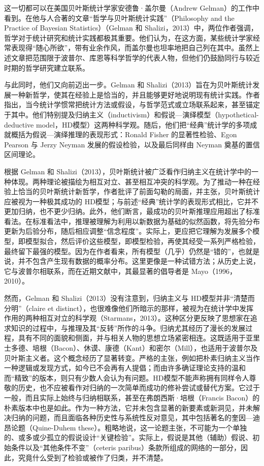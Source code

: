 这一切都可以在美国贝叶斯统计学家安德鲁·盖尔曼（Andrew Gelman）的工作中看到。在他与人合著的文章“哲学与贝叶斯统计实践”（Philosophy and the Practice of Bayesian Statistics）（Gelman 和 Shalizi，2013）中，两位作者强调，哲学对于统计研究和统计实践都极其重要。他们认为，在这方面，某些统计学家经常表现得“随心所欲”，带有业余作风，而盖尔曼也坦率地把自己列在其中。虽然上述文章把范围限于波普尔、库恩等科学哲学的代表人物，但他们仍鼓励同行与较近时期的哲学研究建立联系。

与此同时，他们又向前迈出一步。Gelman 和 Shalizi（2013）旨在为贝叶斯统计发展一种新哲学，使其在经验上是恰当的，并且能够更好地说明现有统计实践。作者指出，当今统计学惯常把统计方法或假设，与哲学范式或立场联系起来，甚至锚定于其中。他们特别提及归纳主义（inductivism）和假说—演绎模型（hypothetical-deductive model，HD模型）这两种科学观。随后，他们把“经典”统计学的多项成就概括为假说—演绎推理的表现形式：Ronald Fisher 的显著性检验、Egon Pearson 与 Jerzy Neyman 发展的假设检验，以及最后同样由 Neyman 奠基的置信区间理论。

根据 Gelman 和 Shalizi（2013），贝叶斯统计被广泛看作归纳主义在统计学中的一种体现。两种理论被描绘为相互对立、甚至相互冲突的科学观。为了推动一种在经验上恰当的贝叶斯统计新哲学，作者批评了前面勾勒的局面，并主张，贝叶斯统计应被视为一种极其成功的 HD模型；与前述“经典”统计学的表现形式相比，它并不更加归纳，也不更少归纳。此外，他们断言，最成功的贝叶斯推理应用超出了标准看法。在标准看法中，推理被理解为利用以新数据为基础的似然函数，将先验分布更新为后验分布，随后相应调整“信念程度”。实际上，更应把它理解为发展多个模型，即模型拟合，然后评价这些模型，即模型检验，再使其经受一系列严格检验，最终留下最强的模型。因为在作者看来，所有模型（几乎）仍然是“错的”，也就是说，并不包含产生现有数据的概率分布。这里更像是一种试错方法；从历史上说，它与波普尔相联系，而在近期文献中，其最显著的倡导者是 Mayo（1996，2010）。

然而，Gelman 和 Shalizi（2013）没有注意到，归纳主义与 HD模型并非“清楚而分明”（claire et distinct），也很难像他们所暗示的那样，被视为在统计学中发挥作用的两种相互对立的科学观（Starmans，2013）。这种区分更反映了思想家在追求知识的过程中，与推理及其“反转”所作的斗争。归纳尤其经历了漫长的发展过程，具有不同的面貌和侧面，并与相关人物的思想立场紧密相连。这既适用于亚里士多德、培根（Bacon）、休谟、康德（Kant）和密尔（Mill），也适用于波普尔及贝叶斯主义者。这个概念经历了显著转变。严格的主张，例如把朴素归纳主义当作一种逻辑或发现方式，如今已不会再有人提倡；而由许多确证理论支持的温和而“精致”的版本，则只有少数人会认为有问题。HD模型不能声称拥有同样令人尊敬的历史，也不应被看作对归纳的一次简单而成功的修补尝试或替代方案。它过于一般，而且实际上始终与归纳相联系，甚至在弗朗西斯·培根（Francis Bacon）的朴素版本中也是如此。作为一种方法，它并未包含显著的新要素或新洞见，并未解决归纳的问题，而且面临各种历史性与系统性反对意见，其中包括著名的奎因—迪昂论题（Quine-Duhem these）。粗略地说，这一论题主张，不可能为一个单独的、或多或少孤立的假说设计“关键检验”。实际上，假说是其他（辅助）假说、初始条件以及“其他条件不变”（ceteris paribus）条款所组成的网络的一部分，因此，究竟什么受到了检验或被作了归类，并不清楚。

